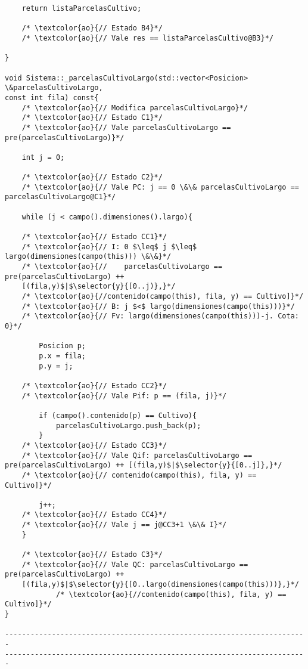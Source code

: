 \begin{lstlisting}
    return listaParcelasCultivo;
    
    /* \textcolor{ao}{// Estado B4}*/	    
    /* \textcolor{ao}{// Vale res == listaParcelasCultivo@B3}*/    
    
}

void Sistema::_parcelasCultivoLargo(std::vector<Posicion> \&parcelasCultivoLargo, 
const int fila) const{
	/* \textcolor{ao}{// Modifica parcelasCultivoLargo}*/	        
    /* \textcolor{ao}{// Estado C1}*/	    
    /* \textcolor{ao}{// Vale parcelasCultivoLargo == pre(parcelasCultivoLargo)}*/      
    
    int j = 0;
	
	/* \textcolor{ao}{// Estado C2}*/	    
    /* \textcolor{ao}{// Vale PC: j == 0 \&\& parcelasCultivoLargo == parcelasCultivoLargo@C1}*/      
    
    while (j < campo().dimensiones().largo){

	/* \textcolor{ao}{// Estado CC1}*/	    
    /* \textcolor{ao}{// I: 0 $\leq$ j $\leq$ largo(dimensiones(campo(this))) \&\&}*/        
    /* \textcolor{ao}{//    parcelasCultivoLargo == pre(parcelasCultivoLargo) ++ 
    [(fila,y)$|$\selector{y}{[0..j)},}*/
    /* \textcolor{ao}{//contenido(campo(this), fila, y) == Cultivo]}*/ 
    /* \textcolor{ao}{// B: j $<$ largo(dimensiones(campo(this)))}*/   
	/* \textcolor{ao}{// Fv: largo(dimensiones(campo(this)))-j. Cota: 0}*/
	     
        Posicion p;
        p.x = fila;
        p.y = j;

    /* \textcolor{ao}{// Estado CC2}*/   
	/* \textcolor{ao}{// Vale Pif: p == (fila, j)}*/
        
        if (campo().contenido(p) == Cultivo){
            parcelasCultivoLargo.push_back(p);
        }
	/* \textcolor{ao}{// Estado CC3}*/
	/* \textcolor{ao}{// Vale Qif: parcelasCultivoLargo == pre(parcelasCultivoLargo) ++ [(fila,y)$|$\selector{y}{[0..j]},}*/
	/* \textcolor{ao}{// contenido(campo(this), fila, y) == Cultivo]}*/

        j++;
    /* \textcolor{ao}{// Estado CC4}*/   
	/* \textcolor{ao}{// Vale j == j@CC3+1 \&\& I}*/
    }
	
	/* \textcolor{ao}{// Estado C3}*/	    
    /* \textcolor{ao}{// Vale QC: parcelasCultivoLargo == pre(parcelasCultivoLargo) ++ 
    [(fila,y)$|$\selector{y}{[0..largo(dimensiones(campo(this)))},}*/
    		/* \textcolor{ao}{//contenido(campo(this), fila, y) == Cultivo]}*/      
}

-----------------------------------------------------------------------
-----------------------------------------------------------------------


\end{lstlisting}
